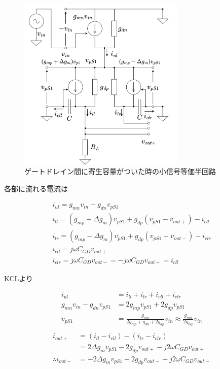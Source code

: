 \documentclass[twocolumn]{jsarticle}
\begin{document}
                \begin{figure}[h]
                    \begin{center}
                        \includegraphics*[width=80mm]{figures/FoldedGilbert_GD_Half_Equivalent.png}
                        \caption{ゲートドレイン間に寄生容量がついた時の小信号等価半回路}
                        \label{fig:eq_gd}
                    \end{center}
                \end{figure}

                各部に流れる電流は

                \begin{align*}
                    i_{ul}=g_{mn}v_{in}-g_{dn}v_{pS1}   \\
                    i_{ll}=(g_{mp}+\Delta g_{m})v_{pS1}+g_{dp}(v_{pS1}-v_{out+})-i_{cll}    \\
                    i_{lr}=(g_{mp}-\Delta g_{m})v_{pS1}+g_{dp}(v_{pS1}-v_{out-})-i_{clr}    \\
                    i_{cll}=j\omega C_{GD}v_{out+}  \\
                    i_{clr}=j\omega C_{GD}v_{out-} = -j\omega C_{GD}v_{out+}=i_{cll}
                \end{align*}

                KCLより

                \begin{align*}
                    i_{ul} &= i_{ll}+i_{lr}+i_{cll}+i_{clr}     \\                   
                    g_{mn}v_{in}-g_{dn}v_{pS1} &= 2g_{mp}v_{pS1}+2g_{dp}v_{pS1}     \\
                    v_{pS1} &= \frac{g_{mn}}{2g_{mp}+g_{dn}+2g_{dp}}v_{in}\approx\frac{g_{mn}}{2g_{mp}}v_{in}   \\
                \end{align*}
                \begin{align*}
                    i_{out+} &= (i_{ll}-i_{cll}) - (i_{lr}-i_{clr})     \\
                    &= 2\Delta g_{m}v_{pS1}-2g_{dp}v_{out+} -j2\omega C_{GD}v_{out+}    \\
                    \therefore i_{out-} &= -2\Delta g_{m}v_{pS1}-2g_{dp}v_{out-} -j2\omega C_{GD}v_{out-}   \\
                \end{align*}
\end{document}
